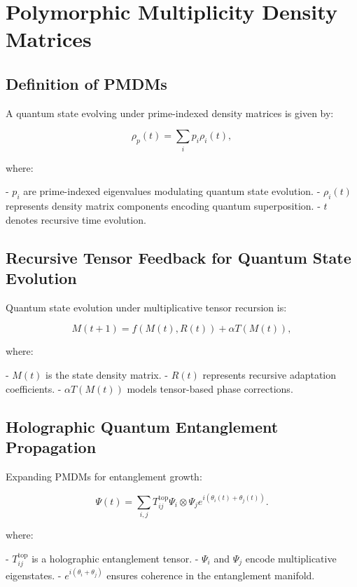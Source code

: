 \documentclass{article}
\theoremstyle{plain}
\begin{document}
\linenumbers

\section{Polymorphic Multiplicity Density Matrices}

\subsection{Definition of PMDMs}
A quantum state evolving under prime-indexed density matrices is given by:

\begin{equation}
\rho_p (t) = \sum_{i} p_i \rho_i (t),
\end{equation}

where:

- \( p_i \) are prime-indexed eigenvalues modulating quantum state evolution.
- \( \rho_i (t) \) represents density matrix components encoding quantum superposition.
- \( t \) denotes recursive time evolution.

\subsection{Recursive Tensor Feedback for Quantum State Evolution}
Quantum state evolution under multiplicative tensor recursion is:

\begin{equation}
M(t+1) = f(M(t), R(t)) + \alpha T (M(t)),
\end{equation}

where:

- \( M(t) \) is the state density matrix.
- \( R(t) \) represents recursive adaptation coefficients.
- \( \alpha T(M(t)) \) models tensor-based phase corrections.

\subsection{Holographic Quantum Entanglement Propagation}
Expanding PMDMs for entanglement growth:

\begin{equation}
\Psi(t) = \sum_{i,j} T^{\text{top}}_{ij} \Psi_i \otimes \Psi_j e^{i(\theta_i(t) + \theta_j(t))}.
\end{equation}

where:

- \( T^{\text{top}}_{ij} \) is a holographic entanglement tensor.
- \( \Psi_i \) and \( \Psi_j \) encode multiplicative eigenstates.
- \( e^{i(\theta_i + \theta_j)} \) ensures coherence in the entanglement manifold.
\end{document}
